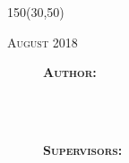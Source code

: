 \begin{titlepage}
\begin{center}

\large

\setlength{\TPHorizModule}{1mm}
\setlength{\TPVertModule}{\TPHorizModule}
\newlength{\backupparindent}
\setlength{\backupparindent}{\parindent}
\setlength{\parindent}{0mm}			
\begin{textblock}{150}(30,50)
    \vspace*{15mm}
    \Huge
    \vspace{4cm}
    \textcolor{OpenlabBlue}{\textbf{\doctitle }}\\
    \Large
    \vspace*{5mm}


    \begin{flushleft}
        \textcolor{OpenlabDarkBlue}{\textsc{August 2018}}\\
        \large
	
    \end{flushleft}
    \vspace*{1in}
    \begin{figure}
        \raggedleft
    \begin{minipage}[r]{0.2 \textwidth} %
   \begin{flushleft}                     %
	\textsc{\textbf{Author:}}\\
    \me\\\bigskip\bigskip

   \normalsize
    \department\\\bigskip\bigskip
    
    \textsc{\textbf{Supervisors:}}\\\medskip
    \firstCommitteeMember\\
    \secondCommitteeMember\\
   \end{flushleft}


\end{minipage}
\end{figure}
\end{textblock}
\end{center}
\end{titlepage}
